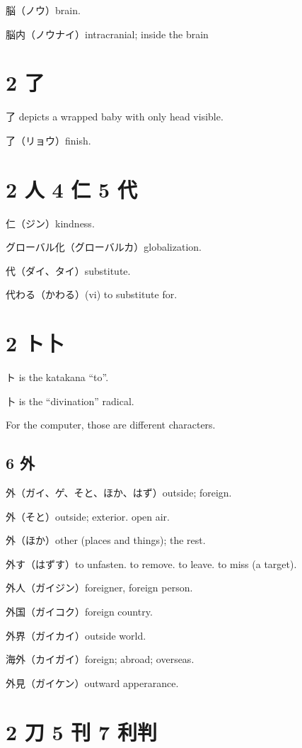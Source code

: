 脳（ノウ）brain.

脳内（ノウナイ）intracranial; inside the brain

\section{2 了}

了 depicts a wrapped baby with only head visible.

了（リョウ）finish.

\section{2 人 4 仁 5 代}

仁（ジン）kindness.

グローバル化（グローバルカ）globalization.

代（ダイ、タイ）substitute.

代わる（かわる）(vi) to substitute for.

\section{2 ト卜}

ト is the katakana ``to''.

卜 is the ``divination'' radical.

For the computer, those are different characters.

\subsection{6 外}

外（ガイ、ゲ、そと、ほか、はず）outside; foreign.

外（そと）outside; exterior. open air.

外（ほか）other (places and things); the rest.

外す（はずす）to unfasten. to remove. to leave. to miss (a target).

外人（ガイジン）foreigner, foreign person.

外国（ガイコク）foreign country.

外界（ガイカイ）outside world.

海外（カイガイ）foreign; abroad; overseas.

外見（ガイケン）outward apperarance.

\section{2 刀 5 刊 7 利判}

